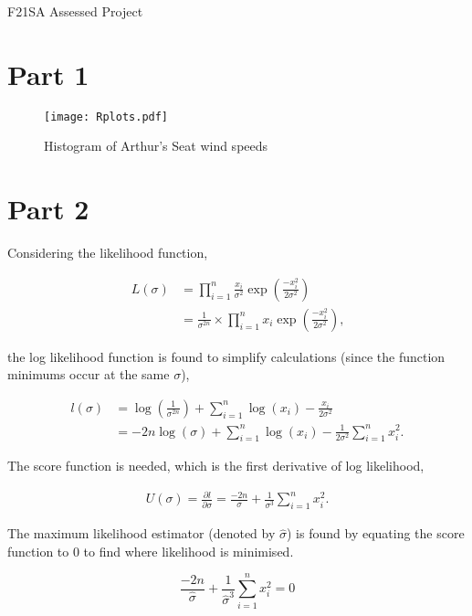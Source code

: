 \documentclass[11pt]{article}
\begin{document}
\begin{center}
    \Large{F21SA Assessed Project}
\end{center}

\section*{Part 1}

\begin{figure}[ht]
    \centering
	\texttt{[image: Rplots.pdf]}
    \caption{Histogram of Arthur's Seat wind speeds}
    \label{fig:histogram}
\end{figure}

\section*{Part 2}

Considering the likelihood function,

\begin{align*}
    L(\sigma) &= \prod_{i=1}^n{ \frac{x_i}{\sigma^2} \exp\left( \frac{-x_i^2}{2 \sigma^2} \right)} \\
    &= \frac{1}{\sigma^{2n}} \times \prod_{i=1}^n{ x_i \exp\left( \frac{-x_i^2}{2 \sigma^2} \right)} \text{,}
\end{align*}

the log likelihood function is found to simplify calculations (since the function minimums occur at the same $\sigma$),

\begin{align*}
    l(\sigma) &= \log\left(\frac{1}{\sigma^{2n}}\right) + \sum_{i=1}^n{ \log(x_i) - \frac{x_i}{2 \sigma^2} } \\
    &= -2n \log(\sigma) + \sum_{i=1}^n{\log(x_i)} - \frac{1}{2 \sigma^2} \sum_{i=1}^n{x_i^2} \text{.}
\end{align*}

The score function is needed, which is the first derivative of log likelihood,

\begin{align*}
    U(\sigma) = \frac{\partial l}{\partial \sigma} = \frac{-2n}{\sigma} + \frac{1}{\sigma^3} \sum_{i=1}^n{x_i^2} \text{.}
\end{align*}

The maximum likelihood estimator (denoted by $ \hat\sigma $) is found by equating the score function to 0 to find where likelihood is minimised.

$$
    \frac{-2n}{\hat{\sigma}} + \frac{1}{\hat{\sigma}^3} \sum_{i=1}^n{x_i^2} = 0
$$
\end{document}

